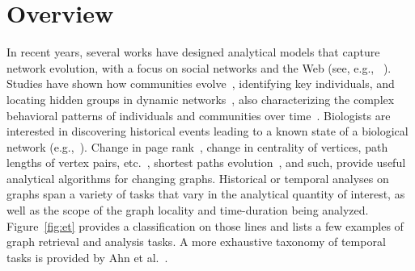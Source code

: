 \documentclass{svjour3}
\begin{document}
\section{Overview}
In recent years, several works have designed analytical models that capture network evolution, with a focus on
social networks and the Web (see, e.g., ~\cite{LeskovecKF07,Kumar:2006:SEO:1150402.1150476}). Studies have shown how communities evolve~\cite{tang2008community}, identifying key individuals,
and locating hidden groups in dynamic networks~\cite{tantipathananandh2007framework}, also characterizing the complex behavioral patterns 
of individuals and communities over time~\cite{Asur2009}.
Biologists are interested in discovering historical events leading to a 
known state of a biological network (e.g.,~\cite{10.1371/journal.pcbi.1001119}).
Change in page rank~\cite{bahmani2010fast}, change in centrality of vertices, path lengths of vertex pairs,
etc.~\cite{pan2011path}, shortest paths evolution~\cite{RenEvolvGraph11}, and such, provide useful analytical algorithms for changing graphs.
Historical or temporal analyses on graphs span a variety of tasks that vary in the analytical quantity of interest, as well as the scope of the graph locality and time-duration being analyzed. 
Figure~\ref{fig:et} provides a classification on those lines and lists a few examples of graph retrieval and analysis tasks.
A more exhaustive taxonomy of temporal tasks is provided by Ahn et al.~\cite{ahn2014task}.
\end{document}
